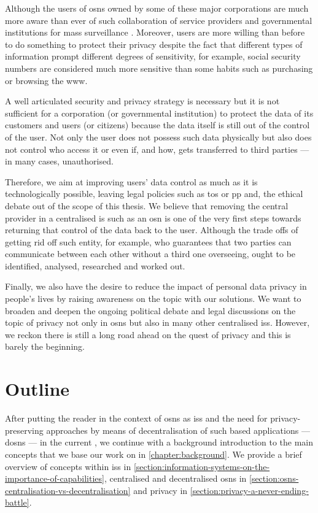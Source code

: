\documentclass[showtrims, oldfontcommands]{kthesis}
\begin{document}
Although the users of \acp{osn} owned by some of these major corporations are much more 
aware than ever of such collaboration of service providers and governmental institutions 
for mass surveillance \cite{Madden14}. Moreover, users are more willing than before 
to do something to protect their privacy despite the fact that different types of 
information prompt different degrees of sensitivity, for example, social security 
numbers are considered much more sensitive than some habits such as purchasing or 
browsing the \ac{www}.

A well articulated security and privacy strategy is necessary but it is not sufficient 
for a corporation (or governmental institution) to protect the data of its customers 
and users (or citizens) because the data itself is still out of the control of the 
user. Not only the user does not possess such data physically but also does not 
control who access it or even if, and how, gets transferred to third parties --- 
in many cases, unauthorised.

Therefore, we aim at improving users' data control as much as it is technologically 
possible, leaving legal policies such as \ac{tos} or \ac{pp} and, the ethical debate 
out of the scope of this thesis. We believe that removing the central provider in 
a centralised \ac{is} such as an \ac{osn} is one of the very first steps towards 
returning that control of the data back to the user. Although the trade offs of 
getting rid off such entity, for example, who guarantees that two parties can communicate 
between each other without a third one overseeing, ought to be identified, analysed, 
researched and worked out.

Finally, we also have the desire to reduce the impact of personal data privacy in 
people's lives by raising awareness on the topic with our solutions. We want to 
broaden and deepen the ongoing political debate and legal discussions on the topic 
of privacy not only in \acp{osn} but also in many other centralised \acp{is}. However, 
we reckon there is still a long road ahead on the quest of privacy and this is barely 
the beginning.

\section{Outline}
    \label{section:outline}
After putting the reader in the context of \acp{osn} as \acp{is} and the need for 
privacy-preserving approaches by means of decentralisation of such \Internet based 
applications --- \acp{dosn} --- in the current , 
we continue with a background introduction to the main concepts that we base our 
work on in \cref{chapter:background}. We provide a brief overview of concepts within 
\acp{is} in \cref{section:information-systems-on-the-importance-of-capabilities}, 
centralised and decentralised \acp{osn} in \cref{section:osns-centralisation-vs-decentralisation} 
and privacy in \cref{section:privacy-a-never-ending-battle}.
\end{document}
